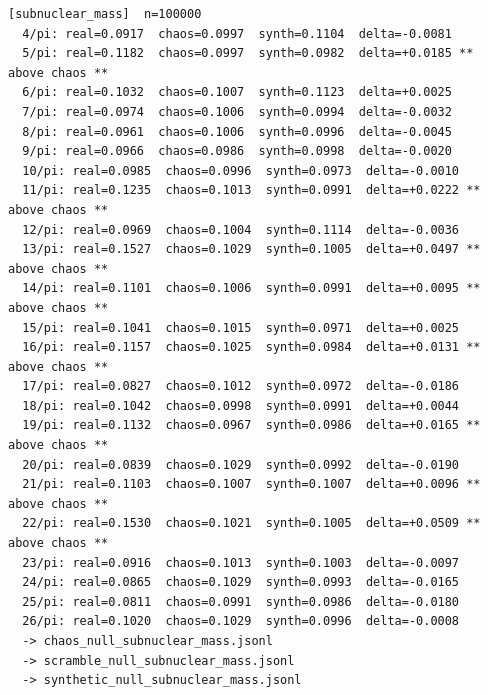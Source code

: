 \documentclass[11pt, letterpaper, openany]{book}
\begin{document}
\begin{empiricalbox}
\begin{lstlisting}[style=terminal]
[subnuclear_mass]  n=100000
  4/pi: real=0.0917  chaos=0.0997  synth=0.1104  delta=-0.0081
  5/pi: real=0.1182  chaos=0.0997  synth=0.0982  delta=+0.0185 ** above chaos **
  6/pi: real=0.1032  chaos=0.1007  synth=0.1123  delta=+0.0025
  7/pi: real=0.0974  chaos=0.1006  synth=0.0994  delta=-0.0032
  8/pi: real=0.0961  chaos=0.1006  synth=0.0996  delta=-0.0045
  9/pi: real=0.0966  chaos=0.0986  synth=0.0998  delta=-0.0020
  10/pi: real=0.0985  chaos=0.0996  synth=0.0973  delta=-0.0010
  11/pi: real=0.1235  chaos=0.1013  synth=0.0991  delta=+0.0222 ** above chaos **
  12/pi: real=0.0969  chaos=0.1004  synth=0.1114  delta=-0.0036
  13/pi: real=0.1527  chaos=0.1029  synth=0.1005  delta=+0.0497 ** above chaos **
  14/pi: real=0.1101  chaos=0.1006  synth=0.0991  delta=+0.0095 ** above chaos **
  15/pi: real=0.1041  chaos=0.1015  synth=0.0971  delta=+0.0025
  16/pi: real=0.1157  chaos=0.1025  synth=0.0984  delta=+0.0131 ** above chaos **
  17/pi: real=0.0827  chaos=0.1012  synth=0.0972  delta=-0.0186
  18/pi: real=0.1042  chaos=0.0998  synth=0.0991  delta=+0.0044
  19/pi: real=0.1132  chaos=0.0967  synth=0.0986  delta=+0.0165 ** above chaos **
  20/pi: real=0.0839  chaos=0.1029  synth=0.0992  delta=-0.0190
  21/pi: real=0.1103  chaos=0.1007  synth=0.1007  delta=+0.0096 ** above chaos **
  22/pi: real=0.1530  chaos=0.1021  synth=0.1005  delta=+0.0509 ** above chaos **
  23/pi: real=0.0916  chaos=0.1013  synth=0.1003  delta=-0.0097
  24/pi: real=0.0865  chaos=0.1029  synth=0.0993  delta=-0.0165
  25/pi: real=0.0811  chaos=0.0991  synth=0.0986  delta=-0.0180
  26/pi: real=0.1020  chaos=0.1029  synth=0.0996  delta=-0.0008
  -> chaos_null_subnuclear_mass.jsonl
  -> scramble_null_subnuclear_mass.jsonl
  -> synthetic_null_subnuclear_mass.jsonl


\end{lstlisting}
\end{empiricalbox}
\end{document}
